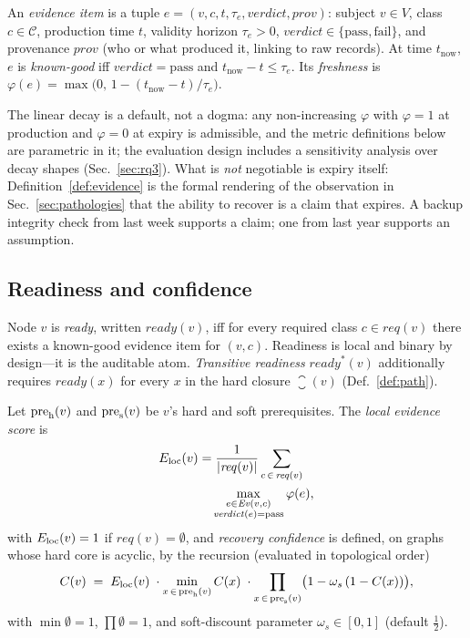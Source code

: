 \begin{definition}
\label{def:evidence}
An \emph{evidence item} is a tuple $e = (v, c, t, \tau_e, \mathit{verdict}, \mathit{prov})$: subject $v \in V$, class $c \in \mathcal{C}$, production time $t$, validity horizon $\tau_e > 0$, $\mathit{verdict} \in \{\text{pass}, \text{fail}\}$, and provenance $\mathit{prov}$ (who or what produced it, linking to raw records). At time $t_{\mathrm{now}}$, $e$ is \emph{known-good} iff $\mathit{verdict} = \text{pass}$ and $t_{\mathrm{now}} - t \leq \tau_e$. Its \emph{freshness} is $\varphi(e) = \max\!\bigl(0,\, 1 - (t_{\mathrm{now}} - t)/\tau_e\bigr)$.
\end{definition}

The linear decay is a default, not a dogma: any non-increasing $\varphi$ with $\varphi = 1$ at production and $\varphi = 0$ at expiry is admissible, and the metric definitions below are parametric in it; the evaluation design includes a sensitivity analysis over decay shapes (Sec.~\ref{sec:rq3}). What is \emph{not} negotiable is expiry itself: Definition~\ref{def:evidence} is the formal rendering of the observation in Sec.~\ref{sec:pathologies} that the ability to recover is a claim that expires. A backup integrity check from last week supports a claim; one from last year supports an assumption.

\subsection{Readiness and confidence}
\label{sec:confidence}

\begin{definition}
\label{def:readiness}
Node $v$ is \emph{ready}, written $\mathit{ready}(v)$, iff for every required class $c \in \mathit{req}(v)$ there exists a known-good evidence item for $(v, c)$. Readiness is local and binary by design---it is the auditable atom. \emph{Transitive readiness} $\mathit{ready}^{*}(v)$ additionally requires $\mathit{ready}(x)$ for every $x$ in the hard closure $\closure(v)$ (Def.~\ref{def:path}).
\end{definition}

\begin{definition}
\label{def:confidence}
Let $\mathrm{pre}_{\mathrm{h}}(v)$ and $\mathrm{pre}_{\mathrm{s}}(v)$ be $v$'s hard and soft prerequisites. The \emph{local evidence score} is
\[
\begin{aligned}
E_{\mathrm{loc}}(v) &= \frac{1}{|\mathit{req}(v)|}
  \sum_{c \,\in\, \mathit{req}(v)} \\
&\quad \max_{\substack{e \in \mathit{Ev}(v,c) \\ \mathit{verdict}(e)=\text{pass}}}
  \varphi(e),
\end{aligned}
\]
with $E_{\mathrm{loc}}(v) = 1$ if $\mathit{req}(v) = \emptyset$,
and \emph{recovery confidence} is defined, on graphs whose hard core is acyclic, by the recursion (evaluated in topological order)
\[
C(v) \;=\; E_{\mathrm{loc}}(v)\;\cdot \min_{x \,\in\, \mathrm{pre}_{\mathrm{h}}(v)} C(x) \;\cdot \prod_{x \,\in\, \mathrm{pre}_{\mathrm{s}}(v)} \bigl(1 - \omega_s\,(1 - C(x))\bigr),
\]
with $\min \emptyset = 1$, $\prod \emptyset = 1$, and soft-discount parameter $\omega_s \in [0,1]$ (default $\tfrac12$).
\end{definition}

